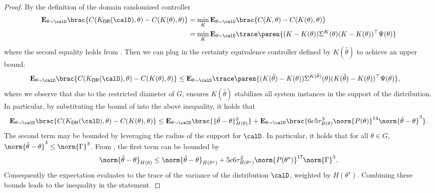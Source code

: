 \begin{proof}
    By the definition of the domain randomized controller
    \begin{align*}
        \mathbf{E}_{\theta \sim \calD} 
        \brac{C(K_{\mathsf{DR}}(\calD), \theta) - C(K(\theta), \theta)} &= \min_{K} \mathbf{E}_{\theta \sim \calD} 
        \brac{C(K , \theta) - C(K(\theta), \theta)} \\
        &= \min_{K} \mathbf{E}_{\theta \sim \calD} \trace\paren{(K-K(\theta))\Sigma^K(\theta) (K-K(\theta))^\top \Psi(\theta)}
    \end{align*}
    where the second equality holds from . 
    Then we can plug in the certainty equivalence controller defined by $K(\hat \theta)$ to achieve an upper bound:
    \begin{align*}
        \mathbf{E}_{\theta \sim \calD} 
        \brac{C(K_{\mathsf{DR}}(\calD), \theta) - C(K(\theta), \theta)} &\leq \mathbf{E}_{\theta \sim \calD} \trace\paren{(K(\hat\theta)-K(\theta))\Sigma^{K(\hat\theta)}(\theta) (K(\hat\theta)-K(\theta))^\top \Psi(\theta)},
    \end{align*}
    where we observe that due to the restricted diameter of $G$,  ensures $K(\hat\theta)$ stabilizes all system instances in the support of the distribution. In particular, by substituting the bound of  into the above inequality, it holds that
    \begin{align}
        \mathbf{E}_{\theta \sim \calD} 
        \brac{C(K_{\mathsf{DR}}(\calD), \theta) - C(K(\theta), \theta)} \leq \mathbf{E}_{\theta \sim \calD}  \brac{\|\hat\theta - \theta\|_{H(\theta)}^2}  +   \mathbf{E}_{\theta \sim \calD}  \brac{6e5\tau_{B(\theta)}^3\norm{P(\theta)}^{14}\norm{\hat\theta-\theta}^3}. \label{eq: DR objective upper bound with theta}
    \end{align}
    The second term may be bounded by leveraging the radius of the support for $\calD$. In particular, it holds that for all $\theta\in G$, $\norm{\hat \theta - \theta}^3 \leq \norm{\Gamma}^3$. 
    From , the first term can be bounded by
    \begin{align*}
        \norm{\hat\theta-\theta}_{H(\theta)} \leq \norm{\hat\theta-\theta}_{H(\theta^\star)} + 5e6\tau_{B(\theta^\star)}^2\norm{P(\theta^\star)}^{17}\norm{\Gamma}^3.
    \end{align*}
    Consequently the expectation evaluates to the trace of the variance of the distribution $\calD$, weighted by $H(\theta^\star)$. Combining these bounds leads to the inequality in the statement. 
\end{proof}

